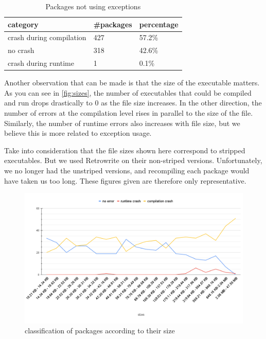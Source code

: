 \documentclass[a4paper,11pt,oneside]{report}
\newcommand{\sysname}{Retrowrite\xspace}
\begin{document}
\begin{table}[H]
    \centering
    \begin{tabular}{lll} 
        \hline
        category                & \#packages & percentage \\ 
        \hline
        crash during compilation & 427  & 57.2\%      \\
        no crash                 & 318  & 42.6\%      \\
        crash during runtime     & 1    & 0.1\%      \\
        \hline
    \end{tabular}
    \caption{Packages not using exceptions}
\end{table}
Another observation that can be made is that the size of the executable
matters. As you can see in \autoref{fig:sizes}, the number of executables that
could be compiled and run drops drastically to 0 as the file size increases. In
the other direction, the number of errors at the compilation level rises in
parallel to the size of the file. Similarly, the number of runtime errors also
increases with file size, but we believe this is more related to exception
usage.

Take into consideration that the file sizes shown here correspond to stripped
executables. But we used \sysname on their non-striped versions.
Unfortunately, we no longer had the unstriped versions, and recompiling each
package would have taken us too long. These figures given are therefore only
representative.


\begin{figure}[H]
    \includegraphics[width=\linewidth]{chart.png} 
    \caption{classification of packages according to their size}
    \label{fig:sizes}
\end{figure}
\end{document}
